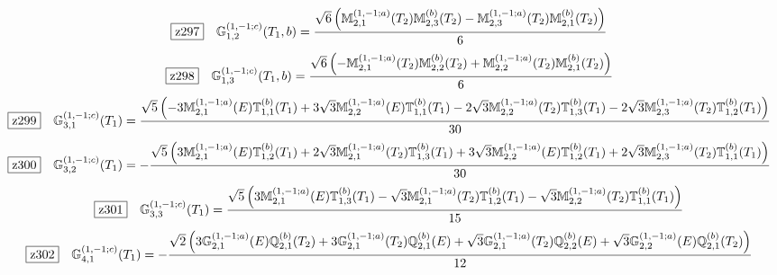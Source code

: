 \documentclass[fleqn,10pt,landscape]{jsarticle}
\begin{document}
\begin{dmath*}
\hspace*{3mm}\fbox{z297}\quad \mathbb{G}_{1,2}^{(1,-1;c)}(T_{1},b)=\frac{\sqrt{6} \left(\mathbb{M}_{2,1}^{(1,-1;a)}(T_{2}) \mathbb{M}_{2,3}^{(b)}(T_{2}) - \mathbb{M}_{2,3}^{(1,-1;a)}(T_{2}) \mathbb{M}_{2,1}^{(b)}(T_{2})\right)}{6}
\end{dmath*}
\begin{dmath*}
\hspace*{3mm}\fbox{z298}\quad \mathbb{G}_{1,3}^{(1,-1;c)}(T_{1},b)=\frac{\sqrt{6} \left(- \mathbb{M}_{2,1}^{(1,-1;a)}(T_{2}) \mathbb{M}_{2,2}^{(b)}(T_{2}) + \mathbb{M}_{2,2}^{(1,-1;a)}(T_{2}) \mathbb{M}_{2,1}^{(b)}(T_{2})\right)}{6}
\end{dmath*}
\begin{dmath*}
\hspace*{3mm}\fbox{z299}\quad \mathbb{G}_{3,1}^{(1,-1;c)}(T_{1})=\frac{\sqrt{5} \left(- 3 \mathbb{M}_{2,1}^{(1,-1;a)}(E) \mathbb{T}_{1,1}^{(b)}(T_{1}) + 3 \sqrt{3} \mathbb{M}_{2,2}^{(1,-1;a)}(E) \mathbb{T}_{1,1}^{(b)}(T_{1}) - 2 \sqrt{3} \mathbb{M}_{2,2}^{(1,-1;a)}(T_{2}) \mathbb{T}_{1,3}^{(b)}(T_{1}) - 2 \sqrt{3} \mathbb{M}_{2,3}^{(1,-1;a)}(T_{2}) \mathbb{T}_{1,2}^{(b)}(T_{1})\right)}{30}
\end{dmath*}
\begin{dmath*}
\hspace*{3mm}\fbox{z300}\quad \mathbb{G}_{3,2}^{(1,-1;c)}(T_{1})=- \frac{\sqrt{5} \left(3 \mathbb{M}_{2,1}^{(1,-1;a)}(E) \mathbb{T}_{1,2}^{(b)}(T_{1}) + 2 \sqrt{3} \mathbb{M}_{2,1}^{(1,-1;a)}(T_{2}) \mathbb{T}_{1,3}^{(b)}(T_{1}) + 3 \sqrt{3} \mathbb{M}_{2,2}^{(1,-1;a)}(E) \mathbb{T}_{1,2}^{(b)}(T_{1}) + 2 \sqrt{3} \mathbb{M}_{2,3}^{(1,-1;a)}(T_{2}) \mathbb{T}_{1,1}^{(b)}(T_{1})\right)}{30}
\end{dmath*}
\begin{dmath*}
\hspace*{3mm}\fbox{z301}\quad \mathbb{G}_{3,3}^{(1,-1;c)}(T_{1})=\frac{\sqrt{5} \left(3 \mathbb{M}_{2,1}^{(1,-1;a)}(E) \mathbb{T}_{1,3}^{(b)}(T_{1}) - \sqrt{3} \mathbb{M}_{2,1}^{(1,-1;a)}(T_{2}) \mathbb{T}_{1,2}^{(b)}(T_{1}) - \sqrt{3} \mathbb{M}_{2,2}^{(1,-1;a)}(T_{2}) \mathbb{T}_{1,1}^{(b)}(T_{1})\right)}{15}
\end{dmath*}
\begin{dmath*}
\hspace*{3mm}\fbox{z302}\quad \mathbb{G}_{4,1}^{(1,-1;c)}(T_{1})=- \frac{\sqrt{2} \left(3 \mathbb{G}_{2,1}^{(1,-1;a)}(E) \mathbb{Q}_{2,1}^{(b)}(T_{2}) + 3 \mathbb{G}_{2,1}^{(1,-1;a)}(T_{2}) \mathbb{Q}_{2,1}^{(b)}(E) + \sqrt{3} \mathbb{G}_{2,1}^{(1,-1;a)}(T_{2}) \mathbb{Q}_{2,2}^{(b)}(E) + \sqrt{3} \mathbb{G}_{2,2}^{(1,-1;a)}(E) \mathbb{Q}_{2,1}^{(b)}(T_{2})\right)}{12}
\end{dmath*}
\end{document}
